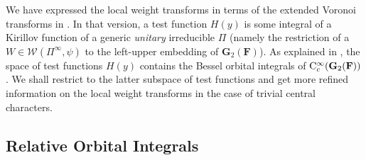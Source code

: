 \documentclass[A4]{amsart}
\numberwithin{equation}{section} \everymath{\displaystyle}
\newcommand{\Cont}{{\rm C}}
\newcommand{\gp}[1]{\mathbf{#1}}
\newcommand{\F}{\mathbf{F}}
\newcommand{\Whi}{\mathcal{W}}
\begin{document}
	We have expressed the local weight transforms in terms of the extended Voronoi transforms in \cite[Theorem 1.4]{Wu24+}. In that version, a test function $H(y)$ is some integral of a Kirillov function of a generic \emph{unitary} irreducible $\Pi$ (namely the restriction of a $W \in \Whi(\Pi^{\infty}, \psi)$ to the left-upper embedding of $\gp{G}_2(\F)$). As explained in \cite[(6.16)]{Wu24+}, the space of test functions $H(y)$ contains the Bessel orbital integrals of $\Cont_c^{\infty}(\gp{G}_2(\F))$. We shall restrict to the latter subspace of test functions and get more refined information on the local weight transforms in the case of trivial central characters.
	

	\subsection{Relative Orbital Integrals}
	\label{sec: ROI}
	
\end{document}

